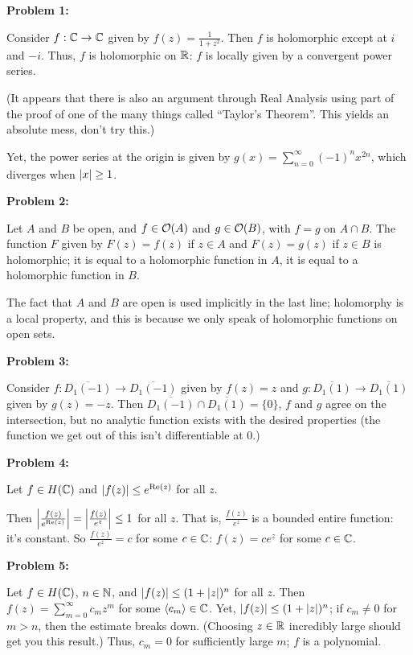 \documentclass[a4paper,12pt]{article}
\begin{document}
{\bf Problem 1:}

Consider $f: \mathbb{C} \to \mathbb{C}$ given by $f(z) = \frac{1}{1+z^2}$. Then $f$ is holomorphic except at $i$ and $-i$. Thus, $f$ is holomorphic on $\mathbb{R}$: $f$ is locally given by a convergent power series.

(It appears that there is also an argument through Real Analysis using part of the proof of one of the many things called ``Taylor's Theorem''. This yields an absolute mess, don't try this.)

Yet, the power series at the origin is given by $g(x) = \sum\limits_{n=0}^\infty (-1)^n x^{2n}$, which diverges when $\left\lvert x \right\rvert \geq 1$.

\shunt

{\bf Problem 2:}

Let $A$ and $B$ be open, and $f \in \mathcal{O}(A)$ and $g \in \mathcal{O}(B)$, with $f=g$ on $A \cap B$. The function $F$ given by $F(z) = f(z)$ if $z \in A$ and $F(z) = g(z)$ if $z \in B$ is holomorphic; it is equal to a holomorphic function in $A$, it is equal to a holomorphic function in $B$.

The fact that $A$ and $B$ are open is used implicitly in the last line; holomorphy is a local property, and this is because we only speak of holomorphic functions on open sets.

\shunt

{\bf Problem 3:}

Consider $f: \overline{D_1(-1)} \to \overline{D_1(-1)}$ given by $f(z) = z$ and $g: \overline{D_1(1)} \to \overline{D_1(1)}$ given by $g(z) = -z$. Then $\overline{D_1(-1)} \cap \overline{D_1(1)} = \{0\}$, $f$ and $g$ agree on the intersection, but no analytic function exists with the desired properties (the function we get out of this isn't differentiable at $0$.)

\shunt

{\bf Problem 4:}

Let $f \in H(\mathbb{C})$ and $\left\lvert f(z) \right\rvert \leq e^{\text{Re}(z)}$ for all $z$.

Then $\left\lvert \frac{f(z)}{e^{\text{Re}(z)}} \right\rvert = \left\lvert \frac{f(z)}{e^z} \right\rvert \leq 1$ for all $z$. That is, $\frac{f(z)}{e^z}$ is a bounded entire function: it's constant. So $\frac{f(z)}{e^z} = c$ for some $c \in \mathbb{C}$: $f(z) = ce^z$ for some $c \in \mathbb{C}$.

\shunt

{\bf Problem 5:}

Let $f \in H(\mathbb{C})$, $n \in \mathbb{N}$, and $\left\lvert f(z) \right\rvert \leq (1+\left\lvert z \right\rvert)^n$ for all $z$. Then $f(z) = \sum\limits_{m=0}^\infty c_mz^m$ for some $\left\langle c_m \right\rangle \in \mathbb{C}$. Yet, $\left\lvert f(z) \right\rvert \leq (1+\left\lvert z \right\rvert)^n$; if $c_m \neq 0$ for $m > n$, then the estimate breaks down. (Choosing $z \in \mathbb{R}$ incredibly large should get you this result.) Thus, $c_m = 0$ for sufficiently large $m$; $f$ is a polynomial.
\end{document}
